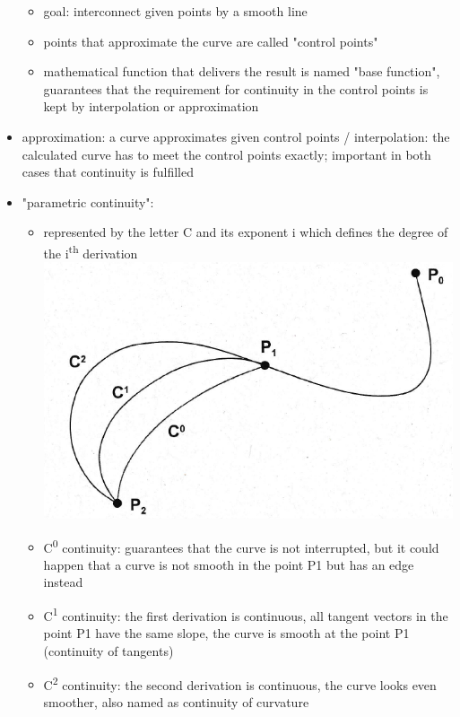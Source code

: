 \documentclass[12pt]{article}
\begin{document}
\begin{itemize}
\begin{itemize}
		\item goal: interconnect given points by a smooth line
		\item points that approximate the curve are called "control points"
		\item mathematical function that delivers the result is named "base function", guarantees that the requirement for continuity in the control points is kept by interpolation or approximation
	\end{itemize}
	\item approximation: a curve approximates given control points / interpolation: the calculated curve has to meet the control points exactly; important in both cases that continuity is fulfilled
	\item "parametric continuity":
	\begin{itemize}
		\item represented by the letter C and its exponent i which defines the degree of the i\textsuperscript{th} derivation \\
		\includegraphics[scale=0.5]{3_24}
		\item C\textsuperscript{0} continuity: guarantees that the curve is not interrupted, but it could happen that a curve is not smooth in the point P1 but has an edge instead
		\item C\textsuperscript{1} continuity: the first derivation is continuous, all tangent vectors in the point P1 have the same slope, the curve is smooth at the point P1 (continuity of tangents)
		\item C\textsuperscript{2} continuity: the second derivation is continuous, the curve looks even smoother, also named as continuity of curvature
	\end{itemize}
\end{itemize}
\end{document}
